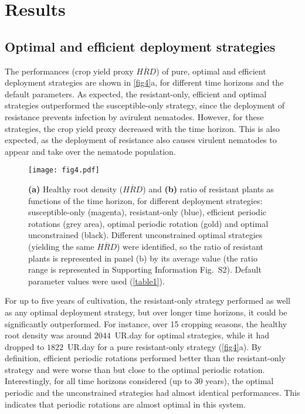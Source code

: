 {{{{%

\section{Results}
\label{sec:Res} 

\subsection{Optimal and efficient deployment strategies} \label{sec:optimal_eff}

The performances (crop yield proxy $\overline{HRD}$) of
pure, optimal and efficient deployment strategies are shown
in \autoref{fig4}a, for different time horizons and the default
parameters. As expected, the resistant-only, efficient and
optimal strategies outperformed the susceptible-only strategy, since
the deployment of resistance prevents infection by avirulent
nematodes. However, for these strategies, {the crop yield proxy}
decreased with the time horizon. This is also expected, as the
deployment of resistance also causes virulent nematodes to appear and
take over the nematode population.

\begin{figure}[htp]
  \centering
  \texttt{[image: fig4.pdf]} 
  \caption[(a) Performance and
    (b) ratio of resistant plants as functions of the time
    horizon, for different deployment strategie]{\textbf{(a)} Healthy root density ($\overline{HRD}$) and
    \textbf{(b)} ratio of resistant plants as functions of the time
    horizon, for different deployment strategies: susceptible-only
    (magenta), resistant-only (blue), efficient periodic rotations (grey
    area), optimal periodic rotation (gold) and optimal
    unconstrained (black). Different unconstrained optimal strategies
    (yielding the same $\overline{HRD}$) were identified, so the ratio
    of resistant plants is represented in panel (b) by its average
    value (the ratio range is represented in Supporting Information Fig.~S2). Default parameter values were used (\autoref{table1}).}
\label{fig4} 
\end{figure}

For up to five years of cultivation, the resistant-only strategy
performed as well as any optimal deployment strategy, but over longer
time horizons, it could be significantly outperformed. For instance,
over 15 cropping seasons, the {healthy root density} was around
$2044$~UR.day for optimal strategies, while it had dropped to
$1822$~UR.day for a pure resistant-only strategy (\autoref{fig4}a). By
definition, efficient periodic rotations performed better than the
resistant-only strategy and were worse than but close to the optimal
periodic rotation.  Interestingly, for all time horizons considered
(up to 30 years), the optimal periodic and the unconstrained
strategies had almost identical performances. This indicates that
periodic rotations are almost optimal in this system.

}}}}
